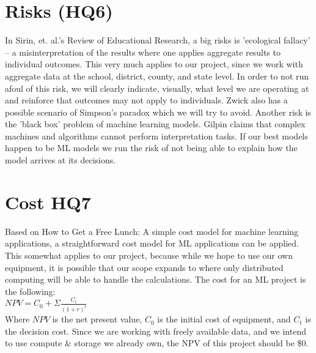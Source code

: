 \documentclass[sigconf,nonacm,11pt]{acmart}
\begin{document}
\section{Risks (HQ6)}
In Sirin, et. al.'s Review of Educational Research, a big risks is 'ecological fallacy' \cite{sirin} -- a misinterpretation of the results where one applies aggregate results to individual outcomes. This very much applies to our project, since we work with aggregate data at the school, district, county, and state level. In order to not run afoul of this risk, we will clearly indicate, visually, what level we are operating at and reinforce that outcomes may not apply to individuals. Zwick also has a possible scenario of Simpson's paradox which we will try to avoid.\cite{collegescores} Another risk is the 'black box' problem of machine learning models. Gilpin claims that complex machines and algorithms cannot perform interpretation tasks.\cite{gilpin} If our best models happen to be ML models we run the risk of not being able to explain how the model arrives at its decisions.

\section{Cost HQ7}
Based on How to Get a Free Lunch: A simple cost model for machine learning applications, a straightforward cost model for ML applications can be applied. \cite{domingos} This somewhat applies to our project, because while we hope to use our own equipment, it is possible that our scope expands to where only distributed computing will be able to handle the calculations.  The cost for an ML project is the following:\\
$NPV = C_0 + \Sigma{\frac{C_t}{(1+r)^t}}$\\
Where $NPV$ is the net present value, $C_0$ is the initial cost of equipment, and $C_t$ is the decision cost. Since we are working with freely available data, and we intend to use compute \& storage we already own, the NPV of this project should be \$0.
\end{document}
